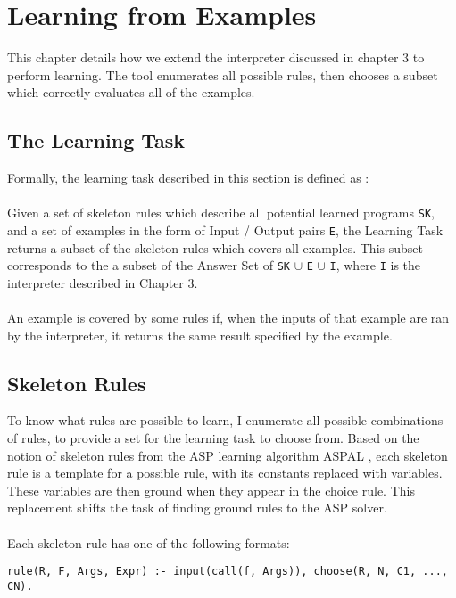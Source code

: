 \chapter{Learning from Examples}

This chapter details how we extend the interpreter discussed in chapter 3 to perform learning. The tool enumerates all possible rules, then chooses a subset which correctly evaluates all of the examples.

\section{The Learning Task}
Formally, the learning task described in this section is defined as : \\ \\
Given a set of skeleton rules which describe all potential learned programs \lstinline!SK!, and a set of examples in the form of Input / Output pairs \lstinline!E!, the Learning Task returns a subset of the skeleton rules which covers all examples. This subset corresponds to the a subset of the Answer Set of \lstinline!SK! $\cup$ \lstinline!E! $\cup$ \lstinline!I!, where \lstinline!I! is the interpreter described in Chapter 3.\\ \\
An example is covered by some rules if, when the inputs of that example are ran by the interpreter, it returns the same result specified by the example.

\section{Skeleton Rules}
To know what rules are possible to learn, I enumerate all possible combinations of rules, to provide a set for the learning task to choose from. Based on the notion of skeleton rules from the ASP learning algorithm ASPAL \cite{Corapi2012}, each skeleton rule is a template for a possible rule, with its constants replaced with variables. These variables are then ground when they appear in the choice rule. This replacement shifts the task of finding ground rules to the ASP solver.\\ \\
Each skeleton rule has one of the following formats: \\

\begin{lstlisting}
rule(R, F, Args, Expr) :- input(call(f, Args)), choose(R, N, C1, ..., CN).
\end{lstlisting}

